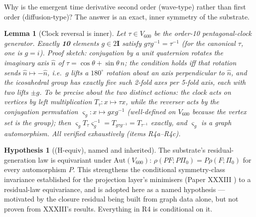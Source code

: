 \documentclass[12pt]{article}
\newtheorem{lemma}[theorem]{Lemma}
\theoremstyle{definition}
\newtheorem{hypothesis}[theorem]{Hypothesis}
\theoremstyle{remark}
\newcommand{\twoI}{2\mathbf{I}}
\newcommand{\Vsix}{V_{600}}
\begin{document}
Why is the emergent time derivative second order (wave-type) rather than first order (diffusion-type)? The answer is an exact, inner symmetry of the substrate.

\begin{lemma}[Clock reversal is inner]\label{lem:reversal}
Let $\tau \in \Vsix$ be the order-10 pentagonal-clock generator. Exactly \textbf{10} elements $g \in \twoI$ satisfy $g\tau g^{-1} = \tau^{-1}$ (for the canonical $\tau$, one is $g = i$). \emph{Proof sketch:} conjugation by a unit quaternion rotates the imaginary axis $\hat n$ of $\tau = \cos\theta + \sin\theta\,\hat n$; the condition holds iff that rotation sends $\hat n \mapsto -\hat n$, i.e.\ $g$ lifts a $180^\circ$ rotation about an axis perpendicular to $\hat n$, and the icosahedral group has exactly five such 2-fold axes per 5-fold axis, each with two lifts $\pm g$. To be precise about the two distinct actions: the \emph{clock} acts on vertices by left multiplication $T_\tau: x \mapsto \tau x$, while the \emph{reverser} acts by the conjugation permutation $\varsigma_g: x \mapsto gxg^{-1}$ (well-defined on $\Vsix$ because the vertex set is the group); then $\varsigma_g T_\tau \varsigma_g^{-1} = T_{g\tau g^{-1}} = T_{\tau^{-1}}$ exactly, and $\varsigma_g$ is a graph automorphism. All verified exhaustively (items R4a--R4c).
\end{lemma}

\begin{hypothesis}[(H-equiv), named and inherited]\label{hyp:equiv}
The substrate's residual-generation law is equivariant under $\mathrm{Aut}(\Vsix)$: $\rho(PF; P\Pi_0) = P\rho(F;\Pi_0)$ for every automorphism $P$. This strengthens the conditional symmetry-class invariance established for the projection layer's minimisers (Paper XXXIII \citep{SmartXXXIII}) to a residual-law equivariance, and is adopted here as a named hypothesis --- motivated by the closure residual being built from graph data alone, but not proven from XXXIII's results. Everything in R4 is conditional on it.
\end{hypothesis}
\end{document}
